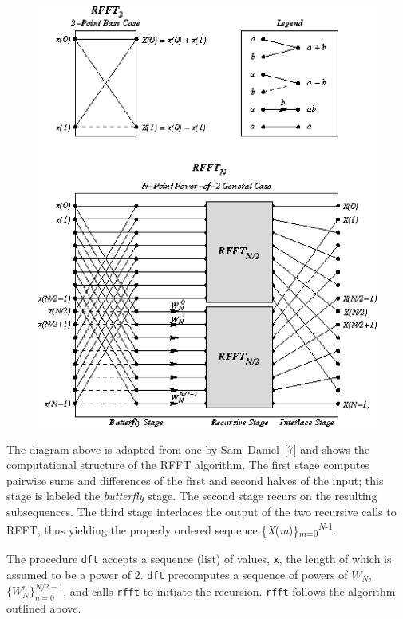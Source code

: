 \begin{figure}[H]
\centering
\includegraphics{math/45.eps}
\end{figure}



The diagram above is adapted from one by
Sam Daniel [\hyperref[bibliography_g225]{7}]
and shows the computational structure of the RFFT algorithm.
The first stage computes pairwise sums and differences
of the first and second halves of the input; this stage is labeled
the \textit{butterfly} stage.
The second stage recurs on the resulting subsequences.
The third stage interlaces the output of the
two recursive calls to RFFT, thus yielding the properly ordered
sequence \{\textit{X}(\textit{m})\}\textsubscript{\textit{m}=0}\textsuperscript{\textit{N}-1}.


The procedure \texttt{dft} accepts a sequence
(list) of values, \texttt{x}, the length of which
is assumed to be a power of 2.
\texttt{dft} precomputes a sequence of powers
of \(W_N\), \(\{W_N^n\}_{n=0}^{N/2-1}\), and calls \texttt{rfft} to
initiate the recursion.
\texttt{rfft} follows the algorithm outlined above.


